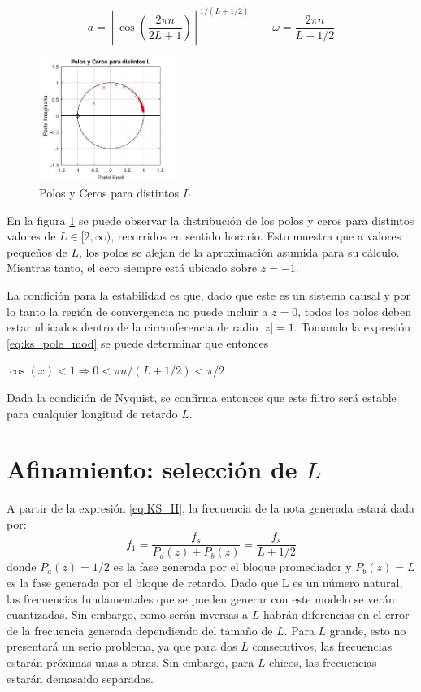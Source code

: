 \begin{equation*}
    a = \left[\cos\left( \frac{2 \pi n}{2L+1}\right)\right]^{1/(L+1/2)} \qquad \omega = \frac{2 \pi n}{L+1/2}
\end{equation*}

\begin{figure}
    \centering
    \includegraphics[width = 0.4\textwidth]{res/ks_zplane_orig.jpg}
    \caption{Polos y Ceros para distintos $L$}
    \label{fig:ks_zplane}
\end{figure}

En la figura \ref{fig:ks_zplane} se puede observar la distribución de los polos y ceros para distintos valores de $L\in[2,\infty)$, recorridos en sentido horario. Esto muestra que a valores pequeños de $L$, los polos se alejan de la aproximación asumida para su cálculo. Mientras tanto, el cero siempre está ubicado sobre $z=-1$.

La condición para la estabilidad es que, dado que este es un sistema causal y por lo tanto la región de convergencia no puede incluir a $z=0$, todos los polos deben estar ubicados dentro de la circunferencia de radio $|z|=1$. Tomando la expresión \eqref{eq:ks_pole_mod} se puede determinar que entonces

$\cos(x) < 1 \Rightarrow 0 < \pi n /(L+1/2) < \pi/2$

Dada la condición de Nyquist, se confirma entonces que este filtro será estable para cualquier longitud de retardo $L$.

\clearpage

\section{Afinamiento: selección de $L$}
A partir de la expresión \eqref{eq:KS_H}, la frecuencia de la nota generada estará dada por:
\begin{equation}
    f_1 = \frac{f_s}{P_a(z) + P_b(z)} = \frac{f_s}{L+1/2}
\end{equation}
donde $P_a(z)=1/2$ es la fase generada por el bloque promediador y $P_b(z)=L$ es la fase generada por el bloque de retardo. Dado que L es un número natural, las frecuencias fundamentales que se pueden generar con este modelo se verán cuantizadas. Sin embargo, como serán inversas a $L$ habrán diferencias en el error de la frecuencia generada dependiendo del tamaño de $L$. Para $L$ grande, esto no presentará un serio problema, ya que para dos $L$ consecutivos, las frecuencias estarán próximas unas a otras. Sin embargo, para $L$ chicos, las frecuencias estarán demasaido separadas.

